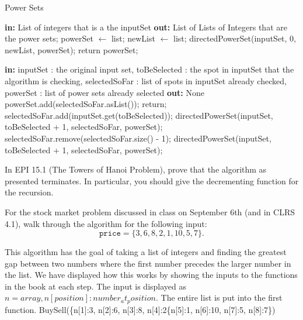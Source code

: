 \documentclass{article}
\begin{document}
  	\begin{algorithm}
	\caption{Power Sets}\label{power sets}
        \begin{algorithmic}[1]
		 \State \textbf{in:} List of integers that is a the inputSet
		 \State \textbf{out: } List of Lists of Integers that are the power sets;  
		 \State powerSet $\gets$ list;
		 \State newList $\gets$ list;
		 \State directedPowerSet(inputSet, 0, newList, powerSet);
		 \State return powerSet;
		 \EndProcedure
		 
		 	\State \textbf{in:} inputSet : the original input set, toBeSelected : the spot in inputSet that the algorithm is checking, selectedSoFar : list of spots in inputSet already checked, powerSet : list of power sets already selected
			\State \textbf{out: } None
				\State powerSet.add(selectedSoFar.asList());
				\State return;
			\EndIf
			\State selectedSoFar.add(inputSet.get(toBeSelected)); 
			\State directedPowerSet(inputSet, toBeSelected + 1, selectedSoFar, powerSet);
			\State selectedSoFar.remove(selectedSoFar.size() - 1);
			\State directedPowerSet(inputSet, toBeSelected + 1, selectedSoFar, powerSet);
		 \EndProcedure
	\end{algorithmic}
	\end{algorithm}


\nextprob
In EPI 15.1 (The Towers of Hanoi Problem), prove that the algorithm as presented
terminates.  In particular, you should give the decrementing function for the
recursion.

\nextprob
For the stock market problem discussed in class on September 6th (and in CLRS
4.1), walk through
the algorithm for the following input:
$$\mathtt{price} = \{ 3, 6, 8, 2, 1, 10, 5, 7 \}. $$

This algorithm has the goal of taking a list of integers and finding the greatest gap between two numbers where the first number precedes the larger number in the list. We have displayed how this works by showing the inputs to the functions in the book at each step. The input is displayed as $n=array, n[position]:number_at_position$.
The entire list is put into the first function.
BuySell(\{n[1]:3, n[2]:6, n[3]:8, n[4]:2\{n[5]:1, n[6]:10, n[7]:5, n[8]:7\})\newline
\end{document}
